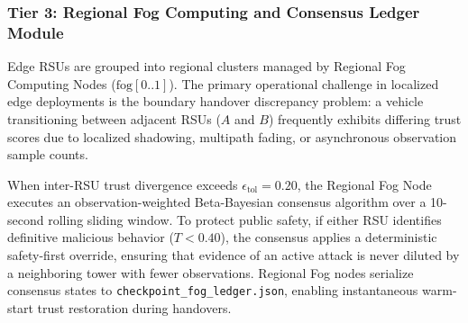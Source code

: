 \documentclass[conference]{IEEEtran}
\begin{document}
\begin{table}[htbp]
\centering
\caption{Three-Class Strict Priority Quality-of-Service (QoS) Queue Scheduling Policy at Edge Roadside Units}
\label{tab:qos_queues}
\end{table}

\subsubsection{Tier 3: Regional Fog Computing and Consensus Ledger Module}
Edge RSUs are grouped into regional clusters managed by Regional Fog Computing Nodes ($\text{fog}[0..1]$). The primary operational challenge in localized edge deployments is the boundary handover discrepancy problem: a vehicle transitioning between adjacent RSUs ($A$ and $B$) frequently exhibits differing trust scores due to localized shadowing, multipath fading, or asynchronous observation sample counts. 

When inter-RSU trust divergence exceeds $\epsilon_{\text{tol}} = 0.20$, the Regional Fog Node executes an observation-weighted Beta-Bayesian consensus algorithm over a 10-second rolling sliding window. To protect public safety, if either RSU identifies definitive malicious behavior ($T < 0.40$), the consensus applies a deterministic safety-first override, ensuring that evidence of an active attack is never diluted by a neighboring tower with fewer observations. Regional Fog nodes serialize consensus states to \texttt{checkpoint\_fog\_ledger.json}, enabling instantaneous warm-start trust restoration during handovers.
\end{document}
